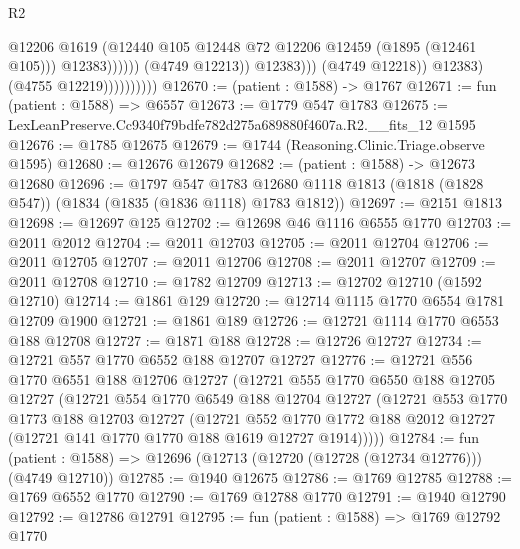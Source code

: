 \begin{lexlean}{R2}
\begin{coremodule}
                                              @12206
                                              @1619
                                              (@12440
                                                @105
                                                @12448
                                                @72
                                                @12206
                                                @12459
                                                (@1895 (@12461 @105)))
                                              @12383))))))
                                  (@4749 @12213))
                                @12383)))
                          (@4749 @12218))
                        @12383)
                      (@4755 @12219))))))))))
@12670 := (patient : @1588) -> @1767
@12671 := fun (patient : @1588) => @6557
@12673 := @1779 @547 @1783
@12675 := LexLeanPreserve.Cc9340f79bdfe782d275a689880f4607a.R2.__fits_12 @1595
@12676 := @1785 @12675
@12679 := @1744 (Reasoning.Clinic.Triage.observe @1595)
@12680 := @12676 @12679
@12682 := (patient : @1588) -> @12673 @12680
@12696 := @1797
    @547
    @1783
    @12680
    @1118
    @1813
    (@1818 (@1828 @547))
    (@1834 (@1835 (@1836 @1118) @1783 @1812))
@12697 := @2151 @1813
@12698 := @12697 @125
@12702 := @12698 @46 @1116 @6555 @1770
@12703 := @2011 @2012
@12704 := @2011 @12703
@12705 := @2011 @12704
@12706 := @2011 @12705
@12707 := @2011 @12706
@12708 := @2011 @12707
@12709 := @2011 @12708
@12710 := @1782 @12709
@12713 := @12702 @12710 (@1592 @12710)
@12714 := @1861 @129
@12720 := @12714 @1115 @1770 @6554 @1781 @12709 @1900
@12721 := @1861 @189
@12726 := @12721 @1114 @1770 @6553 @188 @12708
@12727 := @1871 @188
@12728 := @12726 @12727
@12734 := @12721 @557 @1770 @6552 @188 @12707 @12727
@12776 := @12721
    @556
    @1770
    @6551
    @188
    @12706
    @12727
    (@12721
      @555
      @1770
      @6550
      @188
      @12705
      @12727
      (@12721
        @554
        @1770
        @6549
        @188
        @12704
        @12727
        (@12721
          @553
          @1770
          @1773
          @188
          @12703
          @12727
          (@12721
            @552
            @1770
            @1772
            @188
            @2012
            @12727
            (@12721 @141 @1770 @1770 @188 @1619 @12727 @1914)))))
@12784 := fun (patient : @1588) => @12696 (@12713 (@12720 (@12728 (@12734 @12776))) (@4749 @12710))
@12785 := @1940 @12675
@12786 := @1769 @12785
@12788 := @1769 @6552 @1770
@12790 := @1769 @12788 @1770
@12791 := @1940 @12790
@12792 := @12786 @12791
@12795 := fun (patient : @1588) => @1769 @12792 @1770

\end{coremodule}
\end{lexlean}
